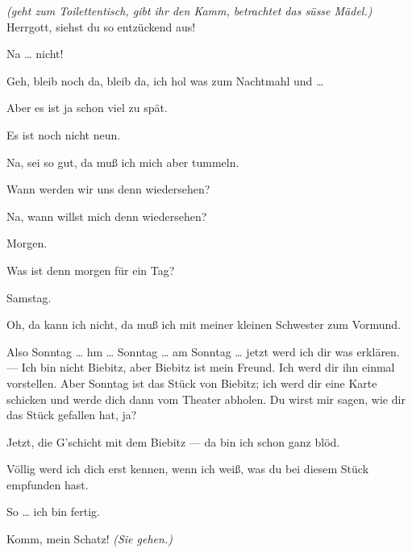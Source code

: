 \documentclass[
	final,
	a4paper,
	ngerman,
	mpinclude = true, %
	twoside = true,
	open = right,
	cleardoublepage = plain,
	DIV = 13,
	BCOR = 1cm,
	titlepage = firstiscover,
	]{scrbook}
\newcommand{\direction}[1]{\textit{(#1)}}
\newcommand{\thecharacter}[1]{\textup{\textsc{#1}}}
\newcommand{\thesuesse}{\thecharacter{Süßes Mädel}}
\newcommand{\thedichter}{\thecharacter{Dichter}}
\newcommand{\character}[1]{\item[#1:]}
\newcommand{\suesse}{\character{\thesuesse}}
\newcommand{\dichter}{\character{\thedichter}}
\begin{document}
\begin{play}
	\dichter
	\direction{geht zum Toilettentisch, gibt ihr den Kamm, betrachtet das süsse Mädel.} Herrgott, siehst du so entzückend aus!

	\suesse
	Na \ldots{} nicht!

	\dichter
	Geh, bleib noch da, bleib da, ich hol was zum Nachtmahl und \ldots{}

	\suesse
	Aber es ist ja schon viel zu spät.

	\dichter
	Es ist noch nicht neun.

	\suesse
	Na, sei so gut, da muß ich mich aber tummeln.

	\dichter
	Wann werden wir uns denn wiedersehen?

	\suesse
	Na, wann willst mich denn wiedersehen?

	\dichter
	Morgen.

	\suesse
	Was ist denn morgen für ein Tag?

	\dichter
	Samstag.

	\suesse
	Oh, da kann ich nicht, da muß ich mit meiner kleinen Schwester zum Vormund.

	\dichter
	Also Sonntag \ldots{} hm \ldots{} Sonntag \ldots{} am Sonntag \ldots{} jetzt werd ich dir was erklären. --- Ich bin nicht Biebitz, aber Biebitz ist mein Freund. Ich werd dir ihn einmal vorstellen. Aber Sonntag ist das Stück von Biebitz; ich werd dir eine Karte schicken und werde dich dann vom Theater abholen. Du wirst mir sagen, wie dir das Stück gefallen hat, ja?

	\suesse
	Jetzt, die G'schicht mit dem Biebitz --- da bin ich schon ganz blöd.

	\dichter
	Völlig werd ich dich erst kennen, wenn ich weiß, was du bei diesem Stück empfunden hast.

	\suesse
	So \ldots{} ich bin fertig.

	\dichter
	Komm, mein Schatz! \direction{Sie gehen.}

\end{play}
\end{document}

